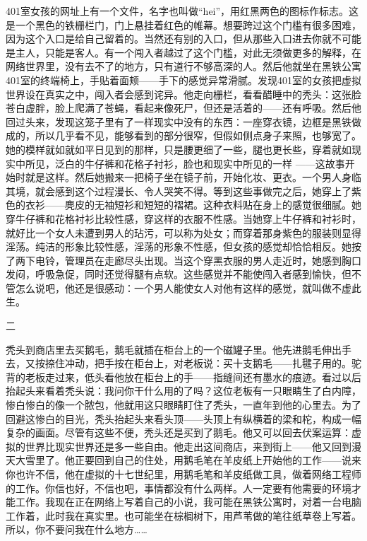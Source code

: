 401室女孩的网址上有一个文件，名字也叫做“hei”，用红黑两色的图标作标志。这是一个黑色的铁栅栏门，门上悬挂着红色的帷幕。想要跨过这个门槛有很多困难，因为这个入口是给自己留着的。当然还有别的入口，但从那些入口进去你就不可能是主人，只能是客人。有一个闯入者越过了这个门槛，对此无须做更多的解释，在网络世界里，没有去不了的地方，只有道行不够高深的人。然后他就坐在黑铁公寓401室的终端椅上，手贴着面颊——手下的感觉异常滑腻。发现401室的女孩把虚拟世界设在真实之中，闯入者会感到诧异。他走向栅栏，看看醋睡中的秃头：这张脸苍白虚胖，脸上爬满了苍蝇，看起来像死尸，但还是活着的——还有呼吸。然后他回过头来，发现这笼子里有了一样现实中没有的东西：一座穿衣镜，边框是黑铁做成的，所以几乎看不见，能够看到的部分很窄，但假如侧点身子来照，也够宽了。她的模样就如就如平日见到的那样，只是腰更细了一些，腿也更长些，穿着就如现实中所见，泛白的牛仔裤和花格子衬衫，脸也和现实中所见的一样 ——这故事开始时就是这样。然后她搬来一把椅子坐在镜子前，开始化妆、更衣。一个男人身临其境，就会感到这个过程漫长、令人哭笑不得。等到这些事做完之后，她穿上了紫色的衣衫——麂皮的无袖短衫和短短的褶裙。这种衣料贴在身上的感觉很细腻。她穿牛仔裤和花格衬衫比较性感，穿这样的衣服不性感。当她穿上牛仔裤和衬衫时，就好比一个女人未遭到男人的玷污，可以称为处女；而穿着那身紫色的服装则显得淫荡。纯洁的形象比较性感，淫荡的形象不性感，但女孩的感觉却恰恰相反。她按了两下电铃，管理员在走廊尽头出现。当这个穿黑衣服的男人走近时，她感到胸口发闷，呼吸急促，同时还觉得腿有点软。这些感觉并不能使闯入者感到愉快，但不管怎么说吧，他还是很感动：一个男人能使女人对他有这样的感觉，就叫做不虚此生。 



二 

秃头到商店里去买鹅毛，鹅毛就插在柜台上的一个磁罐子里。他先进鹅毛伸出手去，又按捺住冲动，把手按在柜台上，对老板说：买十支鹅毛——扎毽子用的。驼背的老板走过来，低头看他放在柜台上的手——指缝间还有墨水的痕迹。看过以后抬起头来看着秃头说：我问你干什么用的了吗？这位老板有一只眼睛生了白内障，惨白惨白的像一个脓包，他就用这只眼睛盯住了秃头，一直年到他的心里去。为了回避这惨白的目光，秃头抬起头来看头顶——头顶上有纵横着的梁和柁，构成一幅复杂的画面。尽管有这些不便，秃头还是买到了鹅毛。他又可以回去伏案运算：虚拟的世界比现实世界还是多一些自由。他走出这间商店，来到街上——他又回到漫天大雪里了。他正要回到自己的住处，用鹅毛笔在羊皮纸上开始他的工作——说来你也许不信，他在虚拟的十七世纪里，用鹅毛笔和羊皮纸做工具，做着网络工程师的工作。你信也好，不信也吧，事情都没有什么两样。人一定要有他需要的环境才能工作。我现在正在网络上写着自己的小说，我可能在黑铁公寓时，对着一台电脑工作着，此时我在真实里。也可能坐在棕榈树下，用芦苇做的笔往纸草卷上写着。所以，你不要问我在什么地方…… 

